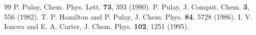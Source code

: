 \documentclass[12pt,a4paper]{article}
\begin{document}
\begin{thebibliography}{99}
 P. Pulay, Chem. Phys. Lett. \textbf{73}, 393 (1980).
 P. Pulay, J. Comput. Chem. \textbf{3}, 556 (1982).
 T. P. Hamilton and P. Pulay, J. Chem. Phys. \textbf{84}, 5728 (1986).
 I. V. Ionova and E. A. Carter, J. Chem. Phys. \textbf{102}, 1251 (1995).
\end{thebibliography}
\end{document}
